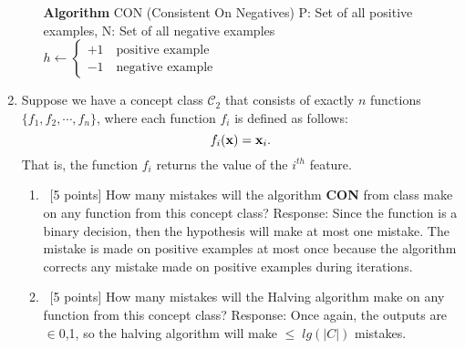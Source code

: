 \begin{enumerate}
\begin{enumerate}
	\textbf{Algorithm} CON (Consistent On Negatives) P: Set of all positive examples, N: Set of all negative examples\\
	\hspace*{1cm} $h \leftarrow \begin{cases}
		+1 \quad \text{positive example} \\
		-1 \quad \text{negative example}
	\end{cases}
	\label{eq-0}$


  \end{enumerate}

\item Suppose we have a concept class $\mathcal{C}_2$ that consists
  of exactly $n$ functions $\{f_1, f_2, \cdots, f_n\}$, where each
  function $f_i$ is defined as follows:
  \begin{equation*}
    f_i({\bf x}) = {\bf x}_i.
  \end{equation*}
  That is, the function $f_i$ returns the value of the $i^{th}$
  feature.
  
  \begin{enumerate}
  \item~[5 points] How many mistakes will the algorithm
    \textbf{CON} from class make on any function from this concept
    class?
    Response: Since the function is a binary decision, then the hypothesis will make at most one mistake. The mistake is made on positive examples at most once because the algorithm corrects any mistake made on positive examples during iterations.
  \item~[5 points] How many mistakes will the Halving algorithm make
    on any function from this concept class?
    Response: Once again, the outputs are $\in${0,1}, so the halving algorithm will make $\leq \; lg(\vert C \vert)$ mistakes.
  \end{enumerate}
  
\end{enumerate}



